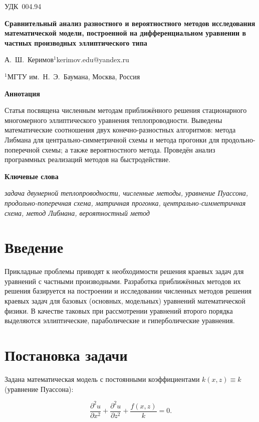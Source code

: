 \documentclass[12pt, a4paper]{article}
\begin{document}
\noindent УДК~004.94

\hfill

\noindent \textbf{Сравнительный анализ разностного и вероятностного методов исследования математической модели, построенной на дифференциальном уравнении в частных производных эллиптического типа}

\noindent А.~Ш.~Керимов$^{1}$\hfill kerimov.edu@yandex.ru

\noindent $^{1}$МГТУ им.~Н.~Э.~Баумана, Москва, Россия

\hfill

\noindent \textbf{Аннотация}

\noindent Статья посвящена численным методам приближённого решения стационарного многомерного эллиптического уравнения теплопроводности.
Выведены математические соотношения двух конечно-разностных алгоритмов: метода Либмана для центрально-симметричной схемы и метода прогонки для продольно-поперечной схемы; а также вероятностного метода. Проведён анализ программных реализаций методов на быстродействие.

\noindent \textbf{Ключевые слова}

\noindent \textit{задача двумерной теплопроводности, численные методы, уравнение Пуассона, продольно-поперечная схема, матричная прогонка, центрально-симметричная схема, метод Либмана, вероятностный метод}

\hfill

\section*{Введение}

Прикладные проблемы приводят к необходимости решения краевых задач для уравнений с частными производными. Разработка приближённых методов их решения базируется на построении и исследовании численных методов решения краевых задач для базовых (основных, модельных) уравнений математической физики. В качестве таковых при рассмотрении уравнений второго порядка выделяются эллиптические, параболические и гиперболические уравнения.

\section{Постановка задачи}

Задана математическая модель с постоянными коэффициентами $k(x, z) \equiv k$ (уравнение Пуассона):

\begin{equation}
	\label{eqn:source}
	\frac{\partial^2 u}{\partial x^2} + \frac{\partial^2 u}{\partial z^2} + \frac{f(x, z)}{k} = 0.
\end{equation}
\end{document}
